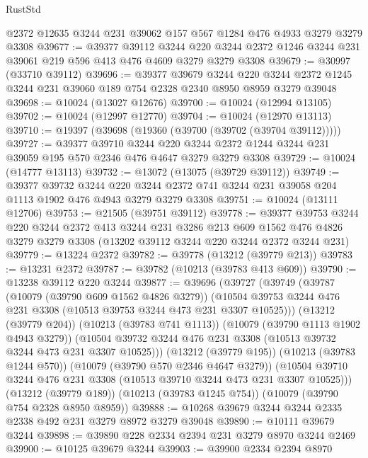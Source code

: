 \begin{lexlean}{RustStd}
\begin{coremodule}
    @2372
    @12635
    @3244
    @231
    @39062
    @157
    @567
    @1284
    @476
    @4933
    @3279
    @3279
    @3308
@39677 := @39377
    @39112
    @3244
    @220
    @3244
    @2372
    @1246
    @3244
    @231
    @39061
    @219
    @596
    @413
    @476
    @4609
    @3279
    @3279
    @3308
@39679 := @30997 (@33710 @39112)
@39696 := @39377
    @39679
    @3244
    @220
    @3244
    @2372
    @1245
    @3244
    @231
    @39060
    @189
    @754
    @2328
    @2340
    @8950
    @8959
    @3279
    @39048
@39698 := @10024 (@13027 @12676)
@39700 := @10024 (@12994 @13105)
@39702 := @10024 (@12997 @12770)
@39704 := @10024 (@12970 @13113)
@39710 := @19397 (@39698 (@19360 (@39700 (@39702 (@39704 @39112)))))
@39727 := @39377
    @39710
    @3244
    @220
    @3244
    @2372
    @1244
    @3244
    @231
    @39059
    @195
    @570
    @2346
    @476
    @4647
    @3279
    @3279
    @3308
@39729 := @10024 (@14777 @13113)
@39732 := @13072 (@13075 (@39729 @39112))
@39749 := @39377
    @39732
    @3244
    @220
    @3244
    @2372
    @741
    @3244
    @231
    @39058
    @204
    @1113
    @1902
    @476
    @4943
    @3279
    @3279
    @3308
@39751 := @10024 (@13111 @12706)
@39753 := @21505 (@39751 @39112)
@39778 := @39377
    @39753
    @3244
    @220
    @3244
    @2372
    @413
    @3244
    @231
    @3286
    @213
    @609
    @1562
    @476
    @4826
    @3279
    @3279
    @3308
    (@13202 @39112 @3244 @220 @3244 @2372 @3244 @231)
@39779 := @13224 @2372
@39782 := @39778 (@13212 (@39779 @213))
@39783 := @13231 @2372
@39787 := @39782 (@10213 (@39783 @413 @609))
@39790 := @13238 @39112 @220 @3244
@39877 := @39696
    (@39727
      (@39749
        (@39787
          (@10079 (@39790 @609 @1562 @4826 @3279))
          (@10504 @39753 @3244 @476 @231 @3308 (@10513 @39753 @3244 @473 @231 @3307 @10525)))
        (@13212 (@39779 @204))
        (@10213 (@39783 @741 @1113))
        (@10079 (@39790 @1113 @1902 @4943 @3279))
        (@10504 @39732 @3244 @476 @231 @3308 (@10513 @39732 @3244 @473 @231 @3307 @10525)))
      (@13212 (@39779 @195))
      (@10213 (@39783 @1244 @570))
      (@10079 (@39790 @570 @2346 @4647 @3279))
      (@10504 @39710 @3244 @476 @231 @3308 (@10513 @39710 @3244 @473 @231 @3307 @10525)))
    (@13212 (@39779 @189))
    (@10213 (@39783 @1245 @754))
    (@10079 (@39790 @754 @2328 @8950 @8959))
@39888 := @10268 @39679 @3244 @3244 @2335 @2338 @492 @231 @3279 @8972 @3279 @39048
@39890 := @10111 @39679 @3244
@39898 := @39890 @228 @2334 @2394 @231 @3279 @8970 @3244 @2469
@39900 := @10125 @39679 @3244
@39903 := @39900 @2334 @2394 @8970

\end{coremodule}
\end{lexlean}
